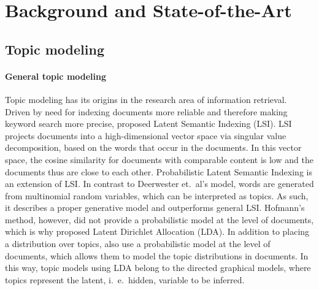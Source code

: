 \section{Background and State-of-the-Art}

\subsection{Topic modeling}
\paragraph{General topic modeling}Topic modeling has its origins in the research area of information retrieval. Driven by need for indexing documents more reliable and therefore making keyword search more precise, \citet{deerwesterscottindexing1990} proposed Latent Semantic Indexing (LSI). LSI projects documents into a high-dimensional vector space via singular value decomposition, based on the words that occur in the documents. In this vector space, the cosine similarity for documents with comparable content is low and the documents thus are close to each other. Probabilistic Latent Semantic Indexing \citep{hofmannprobabilistic1999} is an extension of LSI. In contrast to Deerwester et.~al's model, words are generated from multinomial random variables, which can be interpreted as topics. As such, it describes a proper generative model and outperforms general LSI. Hofmann's method, however, did not provide a probabilistic model at the level of documents, which is why  \citet{bleilatent2003} proposed Latent Dirichlet Allocation (LDA). In addition to placing a distribution over topics, \citet{bleilatent2003} also use a probabilistic model at the level of documents, which allows them to model the topic distributions in documents. In this way, topic models using LDA belong to the directed graphical models, where topics represent the latent, i.~e.~hidden, variable to be inferred.

